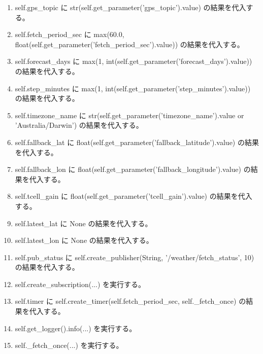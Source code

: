 \documentclass[a4paper,11pt]{article}
\begin{document}
\begin{enumerate}[leftmargin=1.8em]
\item self.gps\_topic に str(self.get\_parameter('gps\_topic').value) の結果を代入する。
\item self.fetch\_period\_sec に max(60.0, float(self.get\_parameter('fetch\_period\_sec').value)) の結果を代入する。
\item self.forecast\_days に max(1, int(self.get\_parameter('forecast\_days').value)) の結果を代入する。
\item self.step\_minutes に max(1, int(self.get\_parameter('step\_minutes').value)) の結果を代入する。
\item self.timezone\_name に str(self.get\_parameter('timezone\_name').value or 'Australia/Darwin') の結果を代入する。
\item self.fallback\_lat に float(self.get\_parameter('fallback\_latitude').value) の結果を代入する。
\item self.fallback\_lon に float(self.get\_parameter('fallback\_longitude').value) の結果を代入する。
\item self.tcell\_gain に float(self.get\_parameter('tcell\_gain').value) の結果を代入する。
\item self.latest\_lat に None の結果を代入する。
\item self.latest\_lon に None の結果を代入する。
\item self.pub\_status に self.create\_publisher(String, '/weather/fetch\_status', 10) の結果を代入する。
\item self.create\_subscription(...) を実行する。
\item self.timer に self.create\_timer(self.fetch\_period\_sec, self.\_fetch\_once) の結果を代入する。
\item self.get\_logger().info(...) を実行する。
\item self.\_fetch\_once(...) を実行する。
            \end{enumerate}
\end{document}
